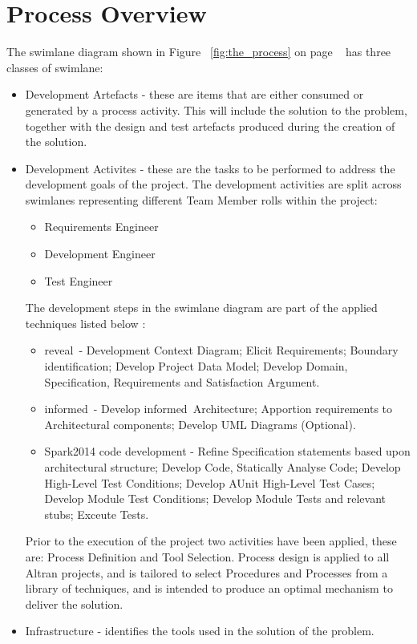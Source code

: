 \documentclass{report}
\newcommand{\spark}[0]{{\sc Spark}}
\newcommand{\reveal}[0]{{\sc reveal}\texttrademark}
\newcommand{\informed}[0]{{\sc informed}}
\begin{document}
\section{Process Overview}
The swimlane diagram shown in Figure ~\ref{fig:the_process} on page
~\pageref{fig:the_process} has three classes of swimlane:

\begin{itemize}
\item Development Artefacts - these are items that are either consumed
  or generated by a process activity. This will include the solution
  to the problem, together with the design and test artefacts produced
  during the creation of the solution.

\item Development Activites - these are the tasks to be performed to
  address the development goals of the project. The development
  activities are split across swimlanes representing different Team
  Member rolls within the project:

  \begin{itemize}
  \item Requirements Engineer
  \item Development Engineer
  \item Test Engineer
  \end{itemize}

  The development steps in the swimlane diagram are part of the
  applied techniques listed below :

  \begin{itemize}
  \item \reveal\ - Development Context Diagram; Elicit Requirements;
    Boundary identification; Develop Project Data Model; Develop
    Domain, Specification, Requirements and Satisfaction Argument.

  \item \informed\ - Develop \informed\ Architecture; Apportion
    requirements to Architectural components; Develop UML Diagrams
    (Optional).

  \item \spark 2014 code development - Refine Specification statements
    based upon architectural structure; Develop Code, Statically
    Analyse Code; Develop High-Level Test Conditions; Develop AUnit
    High-Level Test Cases; Develop Module Test Conditions; Develop
    Module Tests and relevant stubs; Exceute Tests.
  \end{itemize}

  Prior to the execution of the project two activities have been
  applied, these are: Process Definition and Tool Selection.  Process
  design is applied to all Altran projects, and is tailored to
  select Procedures and Processes from a library of techniques, and is
  intended to produce an optimal mechanism to deliver the solution.

\item Infrastructure - identifies the tools used in the solution of
  the problem.
\end{itemize}
\end{document}
